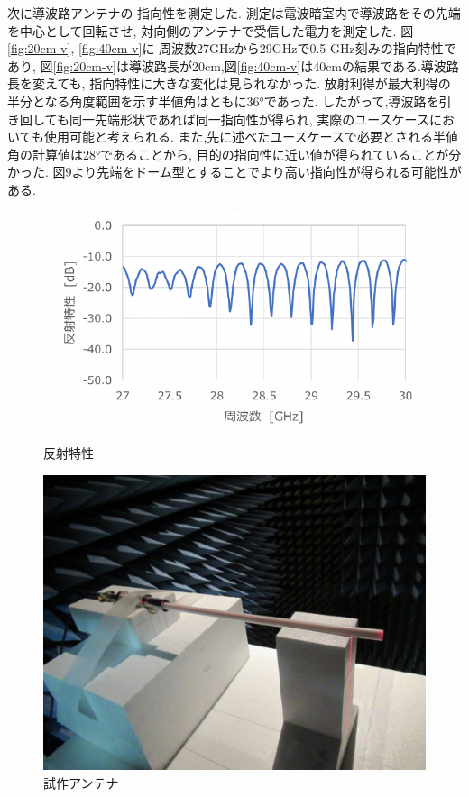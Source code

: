 \documentclass[technicalreport]{ieicej}
\begin{document}
次に導波路アンテナの
指向性を測定した.
測定は電波暗室内で導波路をその先端を中心として回転させ,
対向側のアンテナで受信した電力を測定した.
図\ref{fig:20cm-v}, \ref{fig:40cm-v}に
周波数27GHzから29GHzで0.5 GHz刻みの指向特性であり,
図\ref{fig:20cm-v}は導波路長が20cm,図\ref{fig:40cm-v}は40cmの結果である.導波路長を変えても,
指向特性に大きな変化は見られなかった.
放射利得が最大利得の半分となる角度範囲を示す半値角はともに36°であった.
したがって,導波路を引き回しても同一先端形状であれば同一指向性が得られ,
実際のユースケースにおいても使用可能と考えられる.
また,先に述べたユースケースで必要とされる半値角の計算値は28°であることから,
目的の指向性に近い値が得られていることが分かった.
図9より先端をドーム型とすることでより高い指向性が得られる可能性がある.

\begin{figure}[tb]
  \begin{center}
    \includegraphics[bb=0.000000 0.000000 312.875761 187.419999, width=0.9\linewidth]{img/reflection_params.pdf}
    \caption{反射特性}
    \label{fig:reflection_params}
  \end{center}
\end{figure}

\begin{figure}[tb]
  \begin{center}
    \includegraphics[bb=0.000000 0.000000 522.000000 402.750000, width=0.9\linewidth]{img/docomo_antenna.pdf}
    \caption{試作アンテナ}
    \label{fig:docomo_antenna}
  \end{center}
\end{figure}
\end{document}
